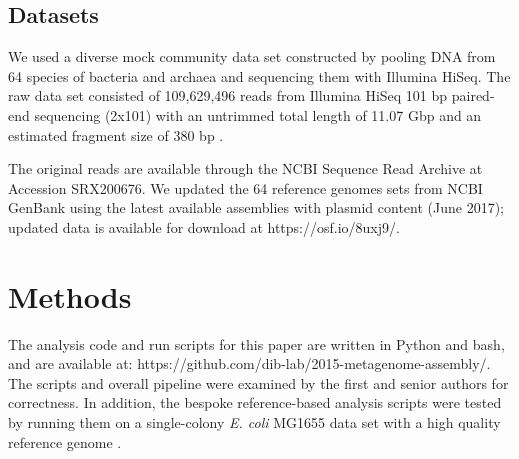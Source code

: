 \documentclass[11pt]{article}
\begin{document}



 

\subsection*{Datasets}

We used a diverse mock community data set constructed by pooling DNA
from 64 species of bacteria and archaea and sequencing them with
Illumina HiSeq.  The raw data set consisted of 109,629,496 reads from
Illumina HiSeq 101 bp paired-end sequencing (2x101) with an untrimmed
total length of 11.07 Gbp and an estimated fragment size of 380 bp
\cite{podar}.
 
The original reads are available through the NCBI Sequence Read
Archive at Accession SRX200676.  We updated the 64 reference genomes
sets from NCBI GenBank using the latest available assemblies with
plasmid content (June 2017); updated data is available for download at
https://osf.io/8uxj9/.

\section*{Methods}

The analysis code and run scripts for this paper are written in Python
and bash, and are available at:
https://github.com/dib-lab/2015-metagenome-assembly/. The scripts and
overall pipeline were examined by the first and senior authors for
correctness.  In addition, the bespoke reference-based analysis
scripts were tested by running them on a single-colony {\em E. coli} MG1655
data set with a high quality reference genome \cite{chitsaz2011}.
\end{document}
